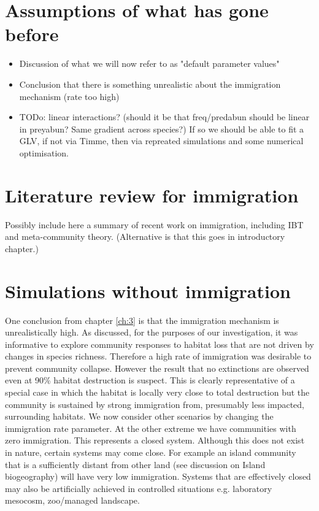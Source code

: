 \section{Assumptions of what has gone before}

\begin{itemize}
	\item Discussion of what we will now refer to as "default parameter values"
	\item Conclusion that there is something unrealistic about the immigration mechanism (rate too high)
	
	\item TODo: linear interactions? (should it be that freq/predabun should be linear in preyabun? Same gradient across species?) If so we should be able to fit a GLV, if not via Timme, then via repreated simulations and some numerical optimisation.
\end{itemize}

\section{Literature review for immigration}

Possibly include here a summary of recent work on immigration, including IBT and meta-community theory. (Alternative is that this goes in introductory chapter.)

\section{Simulations without immigration}
\label{sec:no_immigration}

One conclusion from chapter \ref{ch:3} is that the immigration mechanism is unrealistically high. As discussed, for the purposes of our investigation, it was informative to explore community responses to habitat loss that are not driven by changes in species richness. Therefore a high rate of immigration was desirable to prevent community collapse. However the result that no extinctions are observed even at 90\% habitat destruction is suspect. This is clearly representative of a special case in which the habitat is locally very close to total destruction but the community is sustained by strong immigration from, presumably less impacted, surrounding habitats. We now consider other scenarios by changing the immigration rate parameter. At the other extreme we have communities with zero immigration. This represents a closed system. Although this does not exist in nature, certain systems may come close. For example an island community that is a sufficiently distant from other land (see discussion on Island biogeography) will have very low immigration. Systems that are effectively closed may also be artificially achieved in controlled situations e.g. laboratory mesocosm, zoo/managed landscape.

